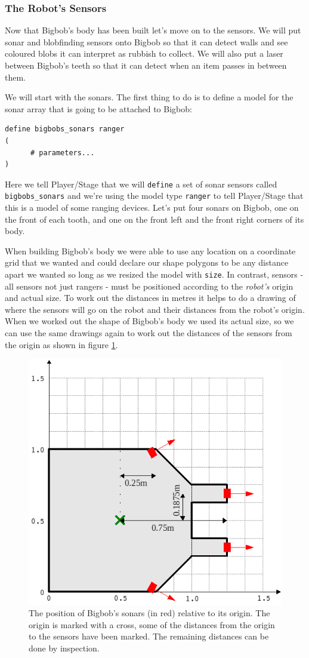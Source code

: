\documentclass[a4paper]{report}
\newcommand{\plst}{Player/Stage\xspace}
\begin{document}
\subsubsection{The Robot's Sensors}\label{sec:examplerobotsensors}
Now that Bigbob's body has been built let's move on to the sensors. We will put sonar and blobfinding sensors onto Bigbob so that it can detect walls and see coloured blobs it can interpret as rubbish to collect. We will also put a laser between Bigbob's teeth so that it can detect when an item passes in between them.

We will start with the sonars. The first thing to do is to define a model for the sonar array that is going to be attached to Bigbob:
\begin{verbatim}
define bigbobs_sonars ranger
(
      # parameters...
)
\end{verbatim}
Here we tell \plst that we will \verb|define| a set of sonar sensors called \verb|bigbobs_sonars| and we're using the model type \verb|ranger| to tell \plst that this is a model of some ranging devices. Let's put four sonars on Bigbob, one on the front of each tooth, and one on the front left and the front right corners of its body. 

When building Bigbob's body we were able to use any location on a coordinate grid that we wanted and could declare our shape polygons to be any distance apart we wanted so long as we resized the model with \verb|size|. In contrast, sensors - all sensors not just rangers - must be positioned according to the \emph{robot's} origin and actual size. To work out the distances in metres it helps to do a drawing of where the sensors will go on the robot and their distances from the robot's origin. When we worked out the shape of Bigbob's body we used its actual size, so we can use the same drawings again to work out the distances of the sensors from the origin as shown in figure \ref{fig:sonardrawing}.

\begin{figure}
	\centering
	\includegraphics[width=0.6\linewidth]{./pics/robot_building/bigbob_sonars.png} 
	\caption{The position of Bigbob's sonars (in red) relative to its origin. The origin is marked with a cross, some of the distances from the origin to the sensors have been marked. The remaining distances can be done by inspection.}
	\label{fig:sonardrawing}
\end{figure}
\end{document}
